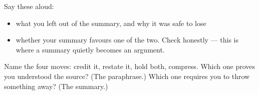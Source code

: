 Say these aloud:

\begin{itemize}
\raggedright
  \item what you left out of the summary, and why it was safe to lose
  \item whether your summary favours one of the two. Check honestly — this is where a summary quietly becomes an argument.
\end{itemize}

\begin{tcolorbox}[breakable,colback=teal!4,colframe=teal!35!black,title={Before you move on}]
Name the four moves: credit it, restate it, hold both, compress. Which one proves you understood the source? (The paraphrase.) Which one requires you to throw something away? (The summary.)
\end{tcolorbox}
